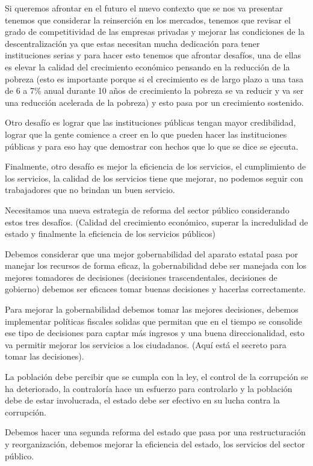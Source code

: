 \documentclass[
  a4paper,
]{article}
\begin{document}
Si queremos afrontar en el futuro el nuevo contexto que se nos va
presentar tenemos que considerar la reinserción en los mercados, tenemos
que revisar el grado de competitividad de las empresas privadas y
mejorar las condiciones de la descentralización ya que estas necesitan
mucha dedicación para tener instituciones serias y para hacer esto
tenemos que afrontar desafíos, una de ellas es elevar la calidad del
crecimiento económico pensando en la reducción de la pobreza (esto es
importante porque si el crecimiento es de largo plazo a una tasa de 6 a
7\% anual durante 10 años de crecimiento la pobreza se va reducir y va
ser una reducción acelerada de la pobreza) y esto pasa por un
crecimiento sostenido.

Otro desafío es lograr que las instituciones públicas tengan mayor
credibilidad, lograr que la gente comience a creer en lo que pueden
hacer las instituciones públicas y para eso hay que demostrar con hechos
que lo que se dice se ejecuta.

Finalmente, otro desafío es mejor la eficiencia de los servicios, el
cumplimiento de los servicios, la calidad de los servicios tiene que
mejorar, no podemos seguir con trabajadores que no brindan un buen
servicio.

Necesitamos una nueva estrategia de reforma del sector público
considerando estos tres desafíos. (Calidad del crecimiento económico,
superar la incredulidad de estado y finalmente la eficiencia de los
servicios públicos)

Debemos considerar que una mejor gobernabilidad del aparato estatal pasa
por manejar los recursos de forma eficaz, la gobernabilidad debe ser
manejada con los mejores tomadores de decisiones (decisiones
trascendentales, decisiones de gobierno) debemos ser eficaces tomar
buenas decisiones y hacerlas correctamente.

Para mejorar la gobernabilidad debemos tomar las mejores decisiones,
debemos implementar políticas fiscales solidas que permitan que en el
tiempo se consolide ese tipo de decisiones para captar más ingresos y
una buena direccionalidad, esto va permitir mejorar los servicios a los
ciudadanos. (Aquí está el secreto para tomar las decisiones).

La población debe percibir que se cumpla con la ley, el control de la
corrupción se ha deteriorado, la contraloría hace un esfuerzo para
controlarlo y la población debe de estar involucrada, el estado debe ser
efectivo en su lucha contra la corrupción.

Debemos hacer una segunda reforma del estado que pasa por una
restructuración y reorganización, debemos mejorar la eficiencia del
estado, los servicios del sector público.
\end{document}
